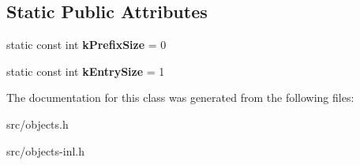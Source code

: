 \subsection*{Static Public Attributes}
\begin{DoxyCompactItemize}
\item 
\hypertarget{classv8_1_1internal_1_1_string_table_shape_aa1859dc6e32c7ac264b48b78bd8bfacc}{}static const int {\bfseries k\+Prefix\+Size} = 0\label{classv8_1_1internal_1_1_string_table_shape_aa1859dc6e32c7ac264b48b78bd8bfacc}

\item 
\hypertarget{classv8_1_1internal_1_1_string_table_shape_a37d6c45788b0b15cc43f490c005f1c74}{}static const int {\bfseries k\+Entry\+Size} = 1\label{classv8_1_1internal_1_1_string_table_shape_a37d6c45788b0b15cc43f490c005f1c74}

\end{DoxyCompactItemize}


The documentation for this class was generated from the following files\+:\begin{DoxyCompactItemize}
\item 
src/objects.\+h\item 
src/objects-\/inl.\+h\end{DoxyCompactItemize}
